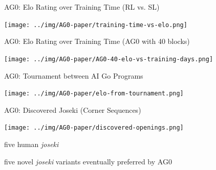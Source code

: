 \documentclass{beamer}
\begin{document}
{    \begin{frame}{AG0: Elo Rating over Training Time (RL vs. SL)}
      \begin{center}
        \texttt{[image: ../img/AG0-paper/training-time-vs-elo.png]}
      \end{center}
    \end{frame}

    \begin{frame}{AG0: Elo Rating over Training Time (AG0 with 40 blocks)}
      \begin{center}
        \texttt{[image: ../img/AG0-paper/AG0-40-elo-vs-training-days.png]}
      \end{center}
    \end{frame}

    \begin{frame}{AG0: Tournament between AI Go Programs}
      \begin{center}
        \texttt{[image: ../img/AG0-paper/elo-from-tournament.png]}
      \end{center}
    \end{frame}

    \begin{frame}{AG0: Discovered Joseki (Corner Sequences)}
      \begin{center}
        \texttt{[image: ../img/AG0-paper/discovered-openings.png]}
      \end{center}
      \pause

      \begin{description}[<+- | alert@+>]
        \item[a] five human \textit{joseki}
        \item[b] five novel \textit{joseki} variants eventually preferred by AG0
      \end{description}
    \end{frame}

  }
\end{document}
